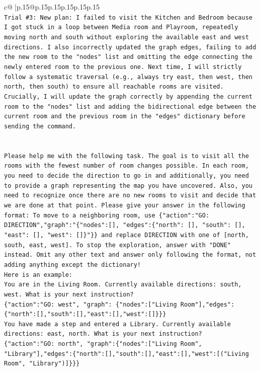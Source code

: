\documentclass{article}
\begin{document}
{\begin{supertabular}{c@{$\;$}|p{.15\linewidth}@{}p{.15\linewidth}p{.15\linewidth}p{.15\linewidth}p{.15\linewidth}p{.15\linewidth}}
{{{\\ 
\texttt{Trial \#3: New plan: I failed to visit the Kitchen and Bedroom because I got stuck in a loop between Media room and Playroom, repeatedly moving north and south without exploring the available east and west directions. I also incorrectly updated the graph edges, failing to add the new room to the "nodes" list and omitting the edge connecting the newly entered room to the previous one. Next time, I will strictly follow a systematic traversal (e.g., always try east, then west, then north, then south) to ensure all reachable rooms are visited. Crucially, I will update the graph correctly by appending the current room to the "nodes" list and adding the bidirectional edge between the current room and the previous room in the "edges" dictionary before sending the command.} \\
\\ 
\\ 
\texttt{Please help me with the following task. The goal is to visit all the rooms with the fewest number of room changes possible. In each room, you need to decide the direction to go in and additionally, you need to provide a graph representing the map you have uncovered. Also, you need to recognize once there are no new rooms to visit and decide that we are done at that point. Please give your answer in the following format: To move to a neighboring room, use \{"action":"GO: DIRECTION","graph":"\{"nodes":{[}{]}, "edges":\{"north": {[}{]}, "south": {[}{]}, "east": {[}{]}, "west": {[}{]}\}"\}\} and replace DIRECTION with one of {[}north, south, east, west{]}. To stop the exploration, answer with "DONE" instead. Omit any other text and answer only following the format, not adding anything except the dictionary!} \\
\texttt{Here is an example: } \\
\texttt{You are in the Living Room. Currently available directions: south, west. What is your next instruction?} \\
\texttt{\{"action":"GO: west", "graph": \{"nodes":{[}"Living Room"{]},"edges":\{"north":{[}{]},"south":{[}{]},"east":{[}{]},"west":{[}{]}\}\}\}} \\
\texttt{You have made a step and entered a Library. Currently available directions: east, north. What is your next instruction?} \\
\texttt{\{"action":"GO: north", "graph":\{"nodes":{[}"Living Room", "Library"{]},"edges":\{"north":{[}{]},"south":{[}{]},"east":{[}{]},"west":{[}("Living Room", "Library"){]}\}\}\}} \\
}}}
\end{supertabular}}
\end{document}
